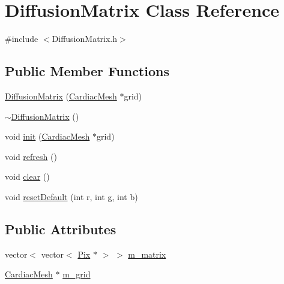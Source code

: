 \hypertarget{class_diffusion_matrix}{\section{Diffusion\+Matrix Class Reference}
\label{class_diffusion_matrix}
}


{\ttfamily \#include $<$Diffusion\+Matrix.\+h$>$}

\subsection*{Public Member Functions}
\begin{DoxyCompactItemize}
\item 
\hyperlink{class_diffusion_matrix_af115adf5551344dbe3f138f1bd322366}{Diffusion\+Matrix} (\hyperlink{class_cardiac_mesh}{Cardiac\+Mesh} $\ast$grid)
\item 
\hyperlink{class_diffusion_matrix_a175bf7eb84803e6cda2b7b5fb044cbe8}{$\sim$\+Diffusion\+Matrix} ()
\item 
void \hyperlink{class_diffusion_matrix_ab4e99bff543fc2dc0daffb5ba30b4e14}{init} (\hyperlink{class_cardiac_mesh}{Cardiac\+Mesh} $\ast$grid)
\item 
void \hyperlink{class_diffusion_matrix_ae204cc3c7fdf07b6cff3883c42bc7363}{refresh} ()
\item 
void \hyperlink{class_diffusion_matrix_a61a64d3a554984ac14ecaf8751eb4fce}{clear} ()
\item 
void \hyperlink{class_diffusion_matrix_ad14d77eb67efb5140552753266c60da8}{reset\+Default} (int r, int g, int b)
\end{DoxyCompactItemize}
\subsection*{Public Attributes}
\begin{DoxyCompactItemize}
\item 
vector$<$ vector$<$ \hyperlink{class_pix}{Pix} $\ast$ $>$ $>$ \hyperlink{class_diffusion_matrix_ae1245cf5edce1c99cc127ed8a82e65ad}{m\+\_\+matrix}
\item 
\hyperlink{class_cardiac_mesh}{Cardiac\+Mesh} $\ast$ \hyperlink{class_diffusion_matrix_a9a2d526a20f9fdfc1b29f0f9f2ce7aef}{m\+\_\+grid}
\end{DoxyCompactItemize}


